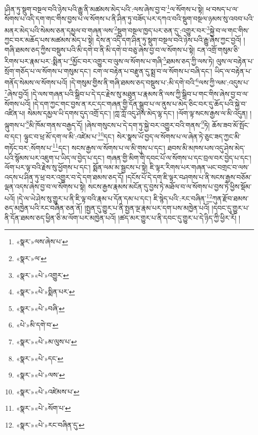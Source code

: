 །ཤིན་ཏུ་སྡུག་བསྔལ་བའི་ཉེས་པའི་རྒྱུ་ནི་མཚམས་མེད་པའི་:ལས་ཞེས་བྱ་བ་\footnote{«སྣར་»ལས་ཞེས་པ་}ལ་སོགས་པ་སྟེ། ཕ་བསད་པ་ལ་སོགས་པ་འདི་དག་གང་གིས་བྱས་པ་ལ་སོགས་པ་ནི་ཤིན་ཏུ་བཟོད་པར་དཀའ་བའི་སྡུག་བསྔལ་ཉམས་སུ་འབབ་པའི་མནར་མེད་པའི་སེམས་ཅན་དམྱལ་བ་གཞན་ལས་\footnote{«སྣར་»ལ་}སྡུག་བསྔལ་ཁྱད་པར་ཅན་དུ་:འགྱུར་བར་\footnote{«སྣར་»«པེ་»འགྱུར་}སྐྱེ་བ་ལ་གང་གིས་ཀྱང་བར་མཆོད་པས་མཚམས་མེད་པ་སྟེ། དེས་ན་འདི་དག་ཤིན་ཏུ་སྡུག་བསྔལ་བའི་ཉེས་པའི་རྒྱུ་ཞེས་ཀྱང་བྱའོ། །གཞི་ཐམས་ཅད་ཀྱིས་བསྡུས་པའི་མི་དགེ་བ་ནི་མི་དགེ་བ་བཅུ་ཞེས་བྱ་བ་ལ་སོགས་པ་སྟེ། ངན་འགྲོ་གསུམ་ཅི་རིགས་པར་རྣམ་པར་:སྨིན་པ་\footnote{«སྣར་»«པེ་»སྨིན་པར་}མྱོང་བར་འགྱུར་བ་ལུས་ལ་སོགས་པ་གཞི་\footnote{«སྣར་»«པེ་»བཞི་}ཐམས་ཅད་ཀྱི་ལས་ཏེ། ལུས་ལ་བརྟེན་པ་སྲོག་གཅོད་པ་ལ་སོགས་པ་གསུམ་དང་། ངག་ལ་བརྟེན་པ་བརྫུན་དུ་སྨྲ་བ་ལ་སོགས་པ་བཞི་དང་། ཡིད་ལ་བརྟེན་པ་གནོད་སེམས་ལ་སོགས་པའོ། །དེ་གསུམ་གྱིས་ནི་གཞི་ཐམས་ཅད་བསྡུས་པ་:མི་དགེ་བའི་\footnote{«པེ་»མི་དགེ་བ་}ལས་ཀྱི་ལམ་:འདུས་པ་\footnote{«སྣར་»«པེ་»མ་ལུས་པ་}ཞེས་བྱའོ། །དེ་ལས་གཞན་པའི་སྒྲིབ་པ་དེ་དང་རྗེས་སུ་མཐུན་པ་རྣམས་ནི་ལས་ཀྱི་སྒྲིབ་པ་གང་གིས་ཞེས་བྱ་བ་ལ་སོགས་པའོ། །དེ་དག་ཀྱང་གང་བྱས་ན་རང་དང་གཞན་གྱི་དོན་སྒྲུབ་པ་ལ་ནུས་པ་མེད་ཅིང་བར་དུ་ཆོད་པའི་སྐྱེ་བ་འཛིན་པ། སེམས་དམྱལ་ཡི་དགས་དུད་འགྲོ་དང་། །ཀླ་ཀློ་འདུ་ཤེས་མེད་ལྷ་དང་། །ལོག་ལྟ་སངས་རྒྱས་ལ་མི་འདུན། །ལྐུགས་པ་\footnote{«སྣར་»«པེ་»དང་}མི་ཁོམ་གནས་བརྒྱད་དོ། །ཞེས་གསུངས་པ་དེ་དག་ཏུ་སྐྱེ་བར་འགྱུར་བའི་གནས་\footnote{«སྣར་»«པེ་»ལས་}ཏེ། ཆོས་ཟབ་མོ་སྤོང་བ་དང་། ལྟུང་བ་ཕྲ་མོ་དག་ལ་མི་:འཛེམ་པ་\footnote{«སྣར་»«པེ་»འཛེམས་པ་}དང་། སེར་སྣས་ཡོ་བྱད་ལ་སོགས་པ་ལ་ཞེན་ཏེ་ཅུང་ཟད་ཀྱང་མི་གཏོང་བར་:སོགས་པ་\footnote{«སྣར་»«པེ་»སོག་པ་}དང་། སངས་རྒྱས་ལ་སོགས་པ་ལ་མི་གུས་པ་དང་། ཐབས་མི་མཁས་པས་འདུ་ཤེས་མེད་པའི་སྙོམས་པར་འཇུག་པ་ཡིད་ལ་བྱེད་པ་དང་། གཞན་གྱི་མིག་གི་དབང་པོ་ལ་སོགས་པ་དང་བྲལ་བར་བྱེད་པ་དང་། ལོག་པར་ལྟ་བའི་རྗེས་སུ་ཕྱོགས་པ་དང་། སྨོན་ལམ་མ་སྦྱངས་པ་སྟེ། ཇི་ལྟར་རིགས་པར་གཞན་ཡང་བགྲང་བ་ལས་འདས་པ་ཤིན་ཏུ་ཕྲ་བར་འགྱུར་བ་དེ་དག་ཐམས་ཅད་དོ། །དངོས་པོ་དེ་དག་ཇི་ལྟར་བཤགས་པ་ནི་སངས་རྒྱས་བཅོམ་ལྡན་འདས་ཞེས་བྱ་བ་ལ་སོགས་པ་སྟེ། སངས་རྒྱས་རྣམས་མངོན་དུ་བྱས་ཏེ་མཐོལ་བ་ལ་སོགས་པ་བྱས་ཏེ་ཕྱིས་སྡོམ་པའོ། །དེ་ལ་ཡེ་ཤེས་སུ་གྱུར་པ་ནི་ཇི་ལྟ་བའི་རྣམ་པ་དོན་དམ་པ་དང་། ཇི་སྙེད་པའི་:རང་བཞིན་\footnote{«སྣར་»«པེ་»རང་བཞིན་དུ་}ཀུན་རྫོབ་ཐམས་ཅད་མཁྱེན་པའི་རང་བཞིན་ཅན་ནོ། །སྤྱན་དུ་གྱུར་པ་ནི་སྤྱན་ལྔ་རྣམ་པར་དག་པས་མཁྱེན་པའོ། །དབང་དུ་གྱུར་པ་ནི་དོན་ཐམས་ཅད་ཕྱིན་ཅི་མ་ལོག་པར་མཁྱེན་པའོ། །ཚད་མར་གྱུར་པ་ནི་དབང་དུ་གྱུར་པ་དེ་ཉིད་ཀྱི་ཕྱིར་རོ། །
